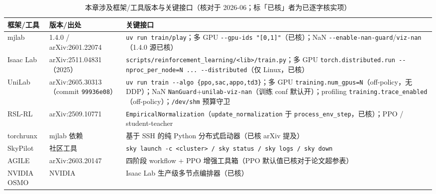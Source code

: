 \begin{table}[H]\centering\small
\caption{本章涉及框架/工具版本与关键接口（核对于 2026-06；标「已核」者为已逐字核实项）}
\label{tab:rlmc-ls-versions}
\begin{tabular}{@{}p{2.6cm}p{2.4cm}p{6.8cm}@{}}
\toprule
框架/工具 & 版本/出处 & 关键接口 \\
\midrule
mjlab & 1.4.0 / arXiv:2601.22074 & \verb|uv run train/play|；多 GPU \verb|--gpu-ids "[0,1]"|（已核）；NaN \verb|--enable-nan-guard|/\verb|viz-nan|（1.4.0 源已核） \\
Isaac Lab & arXiv:2511.04831（2025） & \verb|scripts/reinforcement_learning/<lib>/train.py|；多 GPU \verb|torch.distributed.run --nproc_per_node=N ... --distributed|（仅 Linux，已核） \\
UniLab & arXiv:2605.30313（commit \texttt{99936e08}） & \verb|uv run train --algo {ppo,sac,appo,td3}|；多 GPU \verb|training.num_gpus=N|（off-policy，无 DDP）；NaN \verb|NanGuard|+\verb|unilab-viz-nan|（训练 conf 默认开）；profiling \verb|training.trace_enabled|（off-policy）；\verb|/dev/shm| 预算守卫 \\
RSL-RL & arXiv:2509.10771 & \verb|EmpiricalNormalization|（\verb|update_normalization| 于 \verb|process_env_step|，已核）；PPO / student-teacher \\
torchrunx & mjlab 依赖 & 基于 SSH 的纯 Python 分布式启动器（已核 arXiv 提及） \\
SkyPilot & 社区工具 & \verb|sky launch -c <cluster> / sky status / sky logs / sky down| \\
AGILE & arXiv:2603.20147 & 四阶段 workflow + PPO 增强工具箱（PPO 默认值已核对于论文超参表） \\
NVIDIA OSMO & NVIDIA & Isaac Lab 生产级多节点编排器（已核） \\
\bottomrule
\end{tabular}
\end{table}
